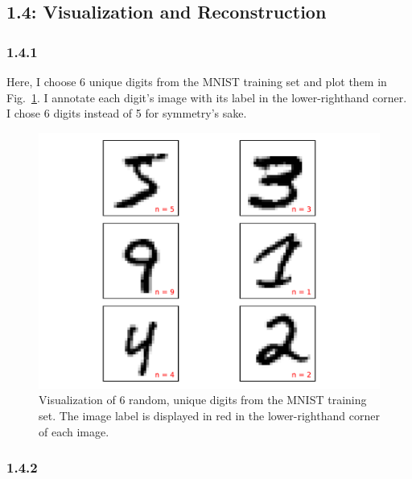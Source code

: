 \documentclass[12pt]{amsart}
\begin{document}
\subsection*{1.4: Visualization and Reconstruction}
\subsubsection*{1.4.1}
Here, I choose 6 unique digits from the MNIST training set and plot them in Fig.~\ref{fig:mnist_digits}.  I annotate each digit's image with its label in the lower-righthand corner.  I chose 6 digits instead of 5 for symmetry's sake.
\begin{figure}[H]
	\includegraphics[width=\columnwidth]{mnist_digits.pdf}
    \caption{Visualization of 6 random, unique digits from the MNIST training set.  The image label is displayed in red in the lower-righthand corner of each image.}
    \label{fig:mnist_digits}
\end{figure}

\subsubsection*{1.4.2}
\end{document}
